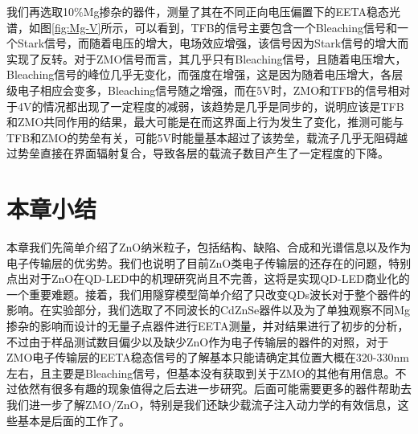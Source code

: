 我们再选取10\%Mg掺杂的器件，测量了其在不同正向电压偏置下的EETA稳态光谱，如图\ref{fig:Mg-V}所示，可以看到，TFB的信号主要包含一个Bleaching信号和一个Stark信号，而随着电压的增大，电场效应增强，该信号因为Stark信号的增大而实现了反转。对于ZMO信号而言，其几乎只有Bleaching信号，且随着电压增大，Bleaching信号的峰位几乎无变化，而强度在增强，这是因为随着电压增大，各层级电子相应会变多，Bleaching信号随之增强，而在5V时，ZMO和TFB的信号相对于4V的情况都出现了一定程度的减弱，该趋势是几乎是同步的，说明应该是TFB和ZMO共同作用的结果，最大可能是在而这界面上行为发生了变化，推测可能与TFB和ZMO的势垒有关，可能5V时能量基本超过了该势垒，载流子几乎无阻碍越过势垒直接在界面辐射复合，导致各层的载流子数目产生了一定程度的下降。

\section{本章小结}
本章我们先简单介绍了ZnO纳米粒子，包括结构、缺陷、合成和光谱信息以及作为电子传输层的优劣势。我们也说明了目前ZnO类电子传输层的还存在的问题，特别点出对于ZnO在QD-LED中的机理研究尚且不完善，这将是实现QD-LED商业化的一个重要难题。接着，我们用隧穿模型简单介绍了只改变QDs波长对于整个器件的影响。在实验部分，我们选取了不同波长的CdZnSe器件以及为了单独观察不同Mg掺杂的影响而设计的无量子点器件进行EETA测量，并对结果进行了初步的分析，不过由于样品测试数目偏少以及缺少ZnO作为电子传输层的器件的对照，对于ZMO电子传输层的EETA稳态信号的了解基本只能请确定其位置大概在320-330nm左右，且主要是Bleaching信号，但基本没有获取到关于ZMO的其他有用信息。不过依然有很多有趣的现象值得之后去进一步研究。后面可能需要更多的器件帮助去我们进一步了解ZMO/ZnO，特别是我们还缺少载流子注入动力学的有效信息，这些基本是后面的工作了。